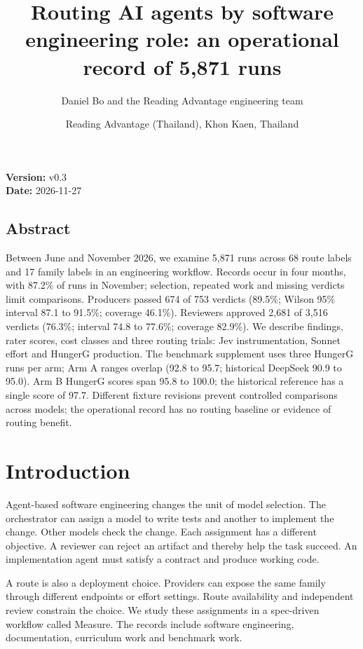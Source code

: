 \documentclass[
  10pt,
  a4paper,
]{article}
\title{Routing AI agents by software engineering role: an operational
record of 5,871 runs}
\author{Daniel Bo and the Reading Advantage engineering team}
\date{Reading Advantage (Thailand), Khon Kaen, Thailand}
\begin{document}
\maketitle

\textbf{Version:} v0.3\\
\textbf{Date:} 2026-11-27

\subsection*{Abstract}\label{abstract}

Between June and November 2026, we examine 5,871 runs across 68 route
labels and 17 family labels in an engineering workflow. Records occur in
four months, with 87.2\% of runs in November; selection, repeated work
and missing verdicts limit comparisons. Producers passed 674 of 753
verdicts (89.5\%; Wilson 95\% interval 87.1 to 91.5\%; coverage 46.1\%).
Reviewers approved 2,681 of 3,516 verdicts (76.3\%; interval 74.8 to
77.6\%; coverage 82.9\%). We describe findings, rater scores, cost
classes and three routing trials: Jev instrumentation, Sonnet effort and
HungerG production. The benchmark supplement uses three HungerG runs per
arm; Arm A ranges overlap (92.8 to 95.7; historical DeepSeek 90.9 to
95.0). Arm B HungerG scores span 95.8 to 100.0; the historical reference
has a single score of 97.7. Different fixture revisions prevent
controlled comparisons across models; the operational record has no
routing baseline or evidence of routing benefit.

\section{Introduction}\label{introduction}

Agent-based software engineering changes the unit of model selection.
The orchestrator can assign a model to write tests and another to
implement the change. Other models check the change. Each assignment has
a different objective. A reviewer can reject an artifact and thereby
help the task succeed. An implementation agent must satisfy a contract
and produce working code.

A route is also a deployment choice. Providers can expose the same
family through different endpoints or effort settings. Route
availability and independent review constrain the choice. We study these
assignments in a spec-driven workflow called Measure. The records
include software engineering, documentation, curriculum work and
benchmark work.
\end{document}
